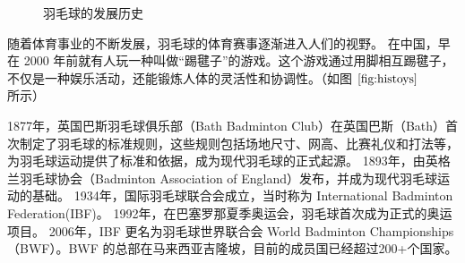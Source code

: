 \documentclass[12pt]{article}
\begin{document}
\begin{figure}[h]
	\centering
	\caption{羽毛球的发展历史}
	\label{fig:histoys}
\end{figure}


随着体育事业的不断发展，羽毛球的体育赛事逐渐进入人们的视野。
在中国，早在 2000 年前就有人玩一种叫做“踢毽子”的游戏。这个游戏通过用脚相互踢毽子，不仅是一种娱乐活动，还能锻炼人体的灵活性和协调性。（如图 $\ref{fig:histoys}$ 所示）

1877年，英国巴斯羽毛球俱乐部（Bath Badminton Club）在英国巴斯（Bath）首次制定了羽毛球的标准规则，这些规则包括场地尺寸、网高、比赛礼仪和打法等，为羽毛球运动提供了标准和依据，成为现代羽毛球的正式起源。
1893年，由英格兰羽毛球协会（Badminton Association of England）发布，并成为现代羽毛球运动的基础。
1934年，国际羽毛球联合会成立，当时称为 International Badminton Federation(IBF)。
1992年，在巴塞罗那夏季奥运会，羽毛球首次成为正式的奥运项目。
2006年，IBF 更名为羽毛球世界联合会 World Badminton Championships（BWF）\cite{bwf2024website}。BWF 的总部在马来西亚吉隆坡，目前的成员国已经超过200+个国家。\cite{historybadminton2024website}
\end{document}

